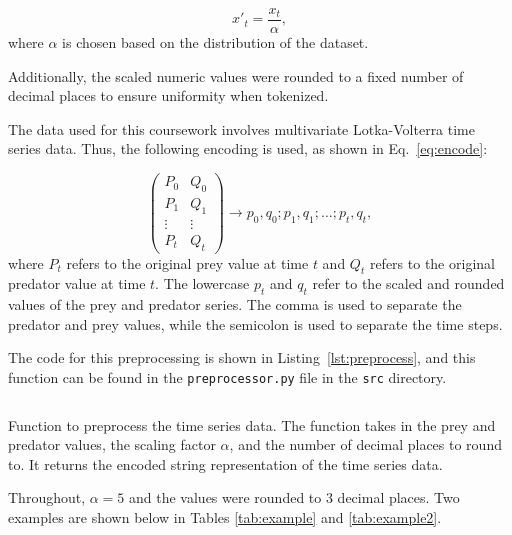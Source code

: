 \documentclass[11pt,a4paper]{article}
\begin{document}
\begin{equation}
    x'_t = \frac{x_t}{\alpha},
    \label{eq:scale}
\end{equation}
where $\alpha$ is chosen based on the distribution of the dataset.

Additionally, the scaled numeric values were rounded to a fixed number of decimal places to ensure uniformity when tokenized.

The data used for this coursework involves multivariate Lotka-Volterra time series data. Thus, the following encoding is used, as shown in Eq.~\ref{eq:encode}:

\begin{equation}
    \begin{pmatrix}
        P_0 & Q_0 \\
        P_1 & Q_1 \\
        \vdots & \vdots \\
        P_t & Q_t 
        \end{pmatrix}  
        \rightarrow p_0,q_0;p_{1},q_{1};\ldots;p_{t},q_{t},
    \label{eq:encode}
\end{equation}
where $P_t$ refers to the original prey value at time $t$ and $Q_t$ refers to the original predator value at time $t$. The lowercase $p_t$ and $q_t$ refer to the scaled and rounded values of the prey and predator series. The comma is used to separate the predator and prey values, while the semicolon is used to separate the time steps.

The code for this preprocessing is shown in Listing~\ref{lst:preprocess}, and this function can be found in the \texttt{preprocessor.py} file in the \texttt{src} directory.

\begin{listing}[h]
\inputminted[firstline=64, lastline=83]{python}{../src/preprocessor.py}
\caption{Function to preprocess the time series data. The function takes in the prey and predator values, the scaling factor $\alpha$, and the number of decimal places to round to. It returns the encoded string representation of the time series data.}
\label{lst:preprocess}
\end{listing}

Throughout, $\alpha=5$ and the values were rounded to 3 decimal places. Two examples are shown below in Tables \ref{tab:example} and \ref{tab:example2}.
\end{document}
